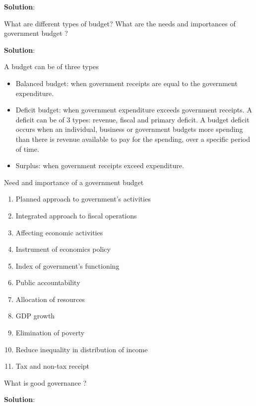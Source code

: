 \documentclass[
]{book}
\newcommand{\question}{\item}
\newenvironment{solution}{ {\bfseries Solution}:}{}
\begin{document}
\begin{questions}
\begin{solution}
\end{solution}

\question What are different types of budget? What are the needs and importances of government budget ?

\begin{solution}

A budget can be of three types
\begin{itemize}
\item Balanced budget: when government receipts are equal to the government expenditure.
\item Deficit budget: when government expenditure exceeds government receipts. A deficit can be of 3 types: revenue, fiscal and primary deficit. A budget deficit occurs when an individual, business or government budgets more spending than there is revenue available to pay for the spending, over a specific period of time.
\item Surplus: when government receipts exceed expenditure.
\end{itemize}

Need and importance of a government budget
\begin{enumerate}
\item Planned approach to government's activities
\item Integrated approach to fiscal operations
\item Affecting economic activities
\item Instrument of economics policy
\item Index of government's functioning
\item Public accountability
\item Allocation of resources
\item GDP growth
\item Elimination of poverty
\item Reduce inequality in distribution of income
\item Tax and non-tax receipt
\end{enumerate}

\end{solution}

\question What is good governance ?

\begin{solution}


\end{solution}
\end{questions}
\end{document}
